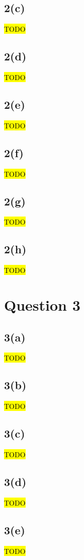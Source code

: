 \documentclass[10pt, a4paper,reqno]{article}
\begin{document}
\subsection*{2(c)}
\hl{TODO}

\subsection*{2(d)}
\hl{TODO}

\subsection*{2(e)}
\hl{TODO}

\subsection*{2(f)}
\hl{TODO}

\subsection*{2(g)}
\hl{TODO}

\subsection*{2(h)}
\hl{TODO}


%
%
\clearpage\section*{Question 3}

\subsection*{3(a)}
\hl{TODO}

\subsection*{3(b)}
\hl{TODO}

\subsection*{3(c)}
\hl{TODO}

\subsection*{3(d)}
\hl{TODO}

\subsection*{3(e)}
\hl{TODO}
\end{document}

